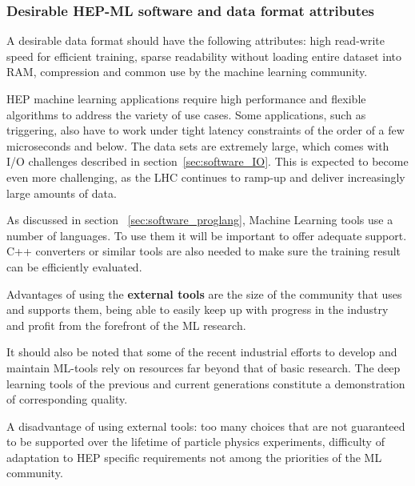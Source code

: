 

\subsubsection{Desirable HEP-ML software and data format attributes}

A desirable data format should have the following attributes: high read-write speed for efficient training, sparse readability without loading entire dataset into RAM, compression and common use by the machine learning community.

HEP machine learning applications require high performance and flexible algorithms to address the variety of use cases. Some applications, such as triggering, also have to work under tight latency constraints of the order of a few microseconds and below. The data sets are extremely large, which comes with I/O challenges described in section~\ref{sec:software_IO}. This is expected to become even more challenging, as the LHC continues to ramp-up and deliver increasingly large amounts of data.


As discussed in section ~\ref{sec:software_proglang}, Machine Learning tools use a number of languages. To use them it will be important to offer adequate support. C++ converters or similar tools are also needed to make sure the training result can be efficiently evaluated.

Advantages of using the {\bf external tools} are the size of the community that uses and supports them, being able to easily keep up with progress in the industry and profit from the forefront of the ML research.

It should also be noted that some of the recent industrial efforts to develop and maintain ML-tools rely on resources far beyond that of basic research. The deep learning tools of the previous and current generations constitute a demonstration of corresponding quality.

A disadvantage of using external tools: too many choices that are not guaranteed to be supported over the lifetime of particle physics experiments, difficulty of adaptation to HEP specific requirements not among the priorities of the ML community.

